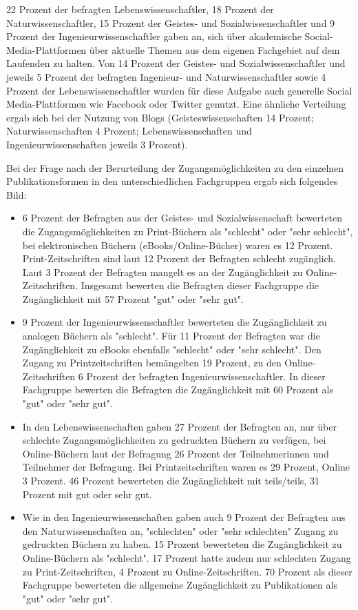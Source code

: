 22 Prozent der befragten Lebenswissenschaftler, 18 Prozent der Naturwissenschaftler, 15 Prozent der Geistes- und Sozialwissenschaftler und 9 Prozent der Ingenieurwissenschaftler gaben an, sich über akademische Social-Media-Plattformen über aktuelle Themen aus dem eigenen Fachgebiet auf dem Laufenden zu halten. Von 14 Prozent der Geistes- und Sozialwissenschaftler und jeweils 5 Prozent der befragten Ingenieur- und Naturwissenschaftler sowie 4 Prozent der Lebenswissenschaftler wurden für diese Aufgabe auch generelle Social Media-Plattformen wie Facebook oder Twitter genutzt. Eine ähnliche Verteilung ergab sich bei der Nutzung von Blogs (Geisteswissenschaften 14 Prozent; Naturwissenschaften 4 Prozent; Lebenswissenschaften und Ingenieurwissenschaften jeweils 3 Prozent).

Bei der Frage nach der Berurteilung der Zugangsmöglichkeiten zu den einzelnen Publikationsformen in den unterschiedlichen Fachgruppen ergab sich folgendes Bild:
\begin{itemize}
\item 6 Prozent der Befragten aus der Geistes- und Sozialwissenschaft bewerteten die Zugangsmöglichkeiten zu Print-Büchern als "schlecht" oder "sehr schlecht", bei elektronischen Büchern (eBooks/Online-Bücher) waren es 12 Prozent. Print-Zeitschriften sind laut 12 Prozent der Befragten schlecht zugänglich. Laut 3 Prozent der Befragten mangelt es an der Zugänglichkeit zu Online-Zeitschriften. Insgesamt bewerten die Befragten dieser Fachgruppe die Zugänglichkeit mit 57 Prozent "gut" oder "sehr gut".
\item 9 Prozent der Ingenieurwissenschaftler bewerteten die Zugänglichkeit zu analogen Büchern als "schlecht". Für 11 Prozent der Befragten war die Zugänglichkeit zu eBooks ebenfalls "schlecht" oder "sehr schlecht". Den Zugang zu Printzeitschriften bemängelten 19 Prozent, zu den Online-Zeitschriften 6 Prozent der befragten Ingenieurwissenschaftler. In dieser Fachgruppe bewerten die Befragten die Zugänglichkeit mit 60 Prozent als "gut" oder "sehr gut".
\item In den Lebenswissenschaften gaben 27 Prozent der Befragten an, nur über schlechte Zugangsmöglichkeiten zu gedruckten Büchern zu verfügen, bei Online-Büchern laut der Befragung 26 Prozent der Teilnehmerinnen und Teilnehmer der Befragung. Bei Printzeitschriften waren es 29 Prozent, Online 3 Prozent. 46 Prozent bewerteten die Zugänglichkeit mit teils/teils, 31 Prozent mit gut oder sehr gut.
\item Wie in den Ingenieurwissenschaften gaben auch 9 Prozent der Befragten aus den Naturwissenschaften an, "schlechten" oder "sehr schlechten" Zugang zu gedruckten Büchern zu haben. 15 Prozent bewerteten die Zugänglichkeit zu Online-Büchern als "schlecht". 17 Prozent hatte zudem nur schlechten Zugang zu Print-Zeitschriften, 4 Prozent zu Online-Zeitschriften. 70 Prozent als dieser Fachgruppe bewerteten die allgemeine Zugänglichkeit zu Publikationen als "gut" oder "sehr gut".
\end{itemize}

